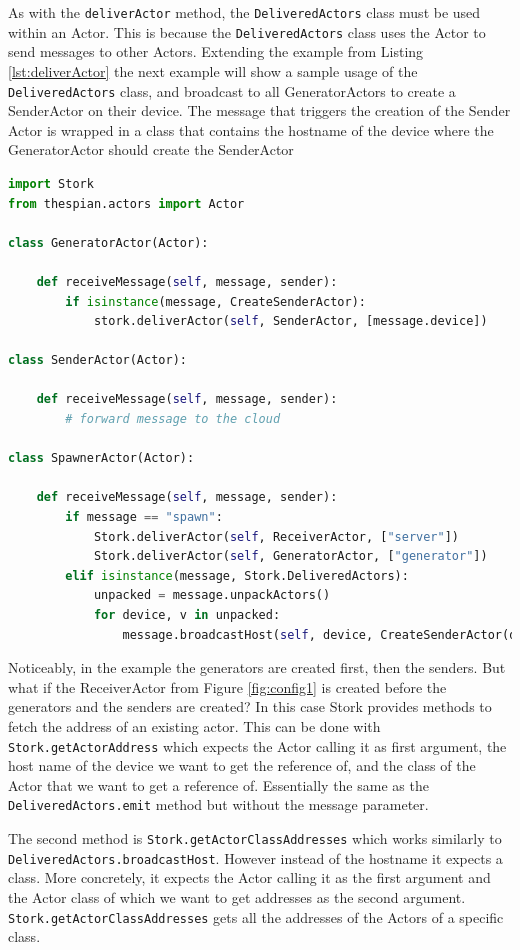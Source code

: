 \documentclass[a4paper]{article}
\begin{document}
As with the \lstinline|deliverActor| method, the \lstinline|DeliveredActors| class must be used within an Actor. This is because the \lstinline|DeliveredActors| class uses the Actor to send messages to other Actors. Extending the example from Listing \ref{lst:deliverActor} the next example will show a sample usage of the \lstinline|DeliveredActors| class, and broadcast to all GeneratorActors to create a SenderActor on their device. The message that triggers the creation of the Sender Actor is wrapped in a class that contains the hostname of the device where the GeneratorActor should create the SenderActor
\vfill
\begin{lstlisting}[language=Python, caption=Receiving the references of the spawned Actors and broadcasting CreateSendActor, label=lst:receive]
import Stork
from thespian.actors import Actor

class GeneratorActor(Actor):

    def receiveMessage(self, message, sender):
        if isinstance(message, CreateSenderActor):
            stork.deliverActor(self, SenderActor, [message.device])

class SenderActor(Actor):

    def receiveMessage(self, message, sender):
        # forward message to the cloud

class SpawnerActor(Actor):

    def receiveMessage(self, message, sender):
        if message == "spawn":
            Stork.deliverActor(self, ReceiverActor, ["server"])
            Stork.deliverActor(self, GeneratorActor, ["generator"])
        elif isinstance(message, Stork.DeliveredActors):
            unpacked = message.unpackActors()
            for device, v in unpacked:
                message.broadcastHost(self, device, CreateSenderActor(device))
\end{lstlisting}
Noticeably, in the example the generators are created first, then the senders. But what if the ReceiverActor from Figure \ref{fig:config1} is created before the generators and the senders are created? In this case Stork provides methods to fetch the address of an existing actor. This can be done with \lstinline|Stork.getActorAddress| which expects the Actor calling it as first argument, the host name of the device we want to get the reference of, and the class of the Actor that we want to get a reference of. Essentially the same as the \lstinline|DeliveredActors.emit| method but without the message parameter.

The second method is \lstinline|Stork.getActorClassAddresses| which works similarly to \lstinline|DeliveredActors.broadcastHost|. However instead of the hostname it expects a class. More concretely, it expects the Actor calling it as the first argument and the Actor class of which we want to get addresses as the second argument. \lstinline|Stork.getActorClassAddresses| gets all the addresses of the Actors of a specific class.
\end{document}
